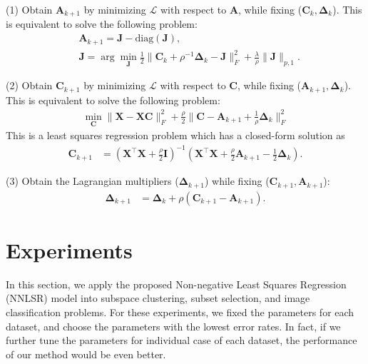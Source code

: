 \documentclass[10pt,twocolumn,letterpaper]{article}
\begin{document}
(1) Obtain $\bm{A}_{k+1}$ by minimizing $\mathcal{L}$ with respect to $\bm{A}$, while fixing ($\bm{C}_{k},\bm{\Delta}_{k}$). This is equivalent to solve the following problem:
\begin{equation}
\begin{split}
\label{e8}
&
\bm{A}_{k+1}
=
\bm{J}-\text{diag}(\bm{J}),
\\
&
\bm{J}
=
\arg\min_{\bm{J}}
\frac{1}{2}
\|
\bm{C}_{k}
+
\rho^{-1}\bm{\Delta}_{k}
-
\bm{J}
\|_{F}^{2}
+
\frac{\lambda}{\rho}
\|
\bm{J}
\|_{p,1}.
\end{split}
\end{equation}

(2) Obtain $\bm{C}_{k+1}$ by minimizing $\mathcal{L}$ with respect to $\bm{C}$, while fixing ($\bm{A}_{k+1},\bm{\Delta}_{k}$). This is equivalent to solve the following problem:
\begin{equation}
\begin{split}
\label{e6}
\min_{\bm{C}}
\|
\bm{X}-\bm{X}\bm{C}
\|_{F}^{2}
+
\frac{\rho}{2}
\|
\bm{C}-\bm{A}_{k+1}+\frac{1}{\rho}\bm{\Delta}_{k}
\|_{F}^{2}
\end{split}
\end{equation}
This is a least squares regression problem which has a closed-form solution as 
\begin{equation}
\begin{split}
\label{e7}
\bm{C}_{k+1} 
&
=
(\bm{X}^{\top}\bm{X}+\frac{\rho}{2}\bm{I})^{-1}
(\bm{X}^{\top}\bm{X}+\frac{\rho}{2}\bm{A}_{k+1}-\frac{1}{2}\bm{\Delta}_{k})
.
\end{split}
\end{equation}

(3) Obtain the Lagrangian multipliers ($\bm{\Delta}_{k+1}$) while fixing ($\bm{C}_{k+1},\bm{A}_{k+1}$):
\begin{equation}
\begin{split}
\label{e10}
\bm{\Delta}_{k+1}
&
=
\bm{\Delta}_{k}
+
\rho
(\bm{C}_{k+1}-\bm{A}_{k+1})
.
\end{split}
\end{equation}


\section{Experiments}

In this section, we apply the proposed Non-negative Least Squares Regression (NNLSR) model into subspace clustering, subset selection, and image classification problems. For these experiments, we fixed the parameters for each dataset, and choose the parameters with the lowest error rates. In fact, if we further tune the parameters for individual case of each dataset, the performance of our method would be even better.
\end{document}
